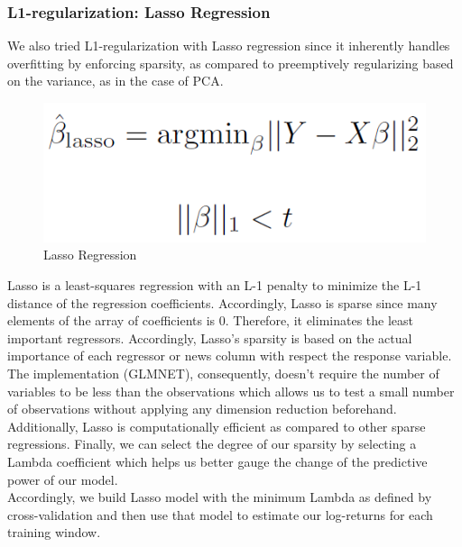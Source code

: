 \subsubsection{L1-regularization: Lasso Regression}
We also tried L1-regularization with Lasso regression since it inherently handles overfitting by enforcing sparsity, as compared to preemptively regularizing based on the variance, as in the case of PCA. \cite{glmnet}
\begin{figure}[ht]
	\vskip 0.2in
	\begin{center}
		\centerline{\includegraphics[scale=0.15]{Lasso.PNG}}
		\caption{Lasso Regression}
	\end{center}
	\vskip -0.2in
	\label{fig: Lasso}
\end{figure}
Lasso is a least-squares regression with an L-1 penalty to minimize the L-1 distance of the regression coefficients. Accordingly, Lasso is sparse since many elements of the array of coefficients is 0. Therefore, it eliminates the least important regressors. Accordingly, Lasso's sparsity is based on the actual importance of each regressor or news column with respect the response variable. The implementation (GLMNET), consequently, doesn't require the number of variables to be less than the observations which allows us to test a small number of observations without applying any dimension reduction beforehand. \cite{glmnet}\\
Additionally, Lasso is computationally efficient as compared to other sparse regressions.\cite{glmnet} Finally, we can select the degree of our sparsity by selecting a Lambda coefficient which helps us better gauge the change of the predictive power of our model. \\
Accordingly, we build Lasso model with the minimum Lambda as defined by cross-validation and then use that model to estimate our log-returns for each training window. \\
